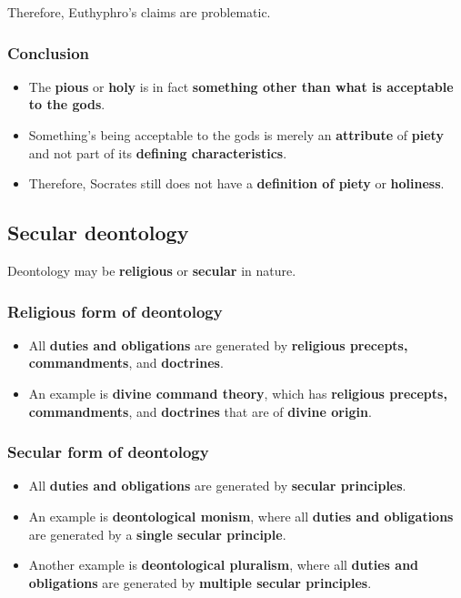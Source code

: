 \documentclass[11pt]{article}
\begin{document}
Therefore, Euthyphro's claims are problematic.
\subsubsection{Conclusion}
\label{sec:org786b2cd}
\begin{itemize}
\item The \textbf{pious} or \textbf{holy} is in fact \textbf{something other than what is acceptable to the gods}.
\item Something's being acceptable to the gods is merely an \textbf{attribute} of \textbf{piety} and not part of its \textbf{defining characteristics}.
\item Therefore, Socrates still does not have a \textbf{definition of piety} or \textbf{holiness}.
\end{itemize}

 \newpage
\subsection{Secular deontology}
\label{sec:org4de8d4e}
Deontology may be \textbf{religious} or \textbf{secular} in nature.
\subsubsection{Religious form of deontology}
\label{sec:orgc507448}
\begin{itemize}
\item All \textbf{duties and obligations} are generated by \textbf{religious precepts, commandments}, and \textbf{doctrines}.
\item An example is \textbf{divine command theory}, which has \textbf{religious precepts, commandments}, and \textbf{doctrines} that are of \textbf{divine origin}.
\end{itemize}
\subsubsection{Secular form of deontology}
\label{sec:org92ae827}
\begin{itemize}
\item All \textbf{duties and obligations} are generated by \textbf{secular principles}.
\item An example is \textbf{deontological monism}, where all \textbf{duties and obligations} are generated by a \textbf{single secular principle}.
\item Another example is \textbf{deontological pluralism}, where all \textbf{duties and obligations} are generated by \textbf{multiple secular principles}.
\end{itemize}
\end{document}

